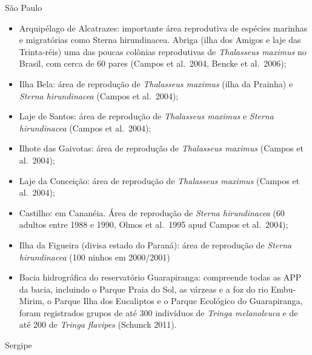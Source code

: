 \documentclass[
  oneside]{scrbook}
\begin{document}
São Paulo

\begin{itemize}
\item
  Arquipélago de Alcatrazes: importante área reprodutiva de espécies marinhas e migratórias como Sterna hirundinacea. Abriga (ilha dos Amigos e laje das Trinta-réis) uma das poucas colônias reprodutivas de \emph{Thalasseus maximus} no Brasil, com cerca de 60 pares (Campos et al.~2004, Bencke et al.~2006);
\item
  Ilha Bela: área de reprodução de \emph{Thalasseus maximus} (ilha da Prainha) e \emph{Sterna hirundinacea} (Campos et al.~2004);
\item
  Laje de Santos: área de reprodução de \emph{Thalasseus maximus} e \emph{Sterna hirundinacea} (Campos et al.~2004);
\item
  Ilhote das Gaivotas: área de reprodução de \emph{Thalasseus maximus} (Campos et al.~2004);
\item
  Laje da Conceição: área de reprodução de \emph{Thalasseus maximus} (Campos et al.~2004);
\item
  Castilho: em Cananéia. Área de reprodução de \emph{Sterna hirundinacea} (60 adultos entre 1988 e 1990, Olmos et al.~1995 apud Campos et al.~2004);
\item
  Ilha da Figueira (divisa estado do Paraná): área de reprodução de \emph{Sterna hirundinacea} (100 ninhos em 2000/2001)
\item
  Bacia hidrográfica do reservatório Guarapiranga: compreende todas as APP da bacia, incluindo o Parque Praia do Sol, as várzeas e a foz do rio Embu-Mirim, o Parque Ilha dos Eucaliptos e o Parque Ecológico do Guarapiranga, foram registrados grupos de até 300 indivíduos de \emph{Tringa melanoleuca} e de até 200 de \emph{Tringa flavipes} (Schunck 2011).
\end{itemize}

Sergipe
\end{document}
